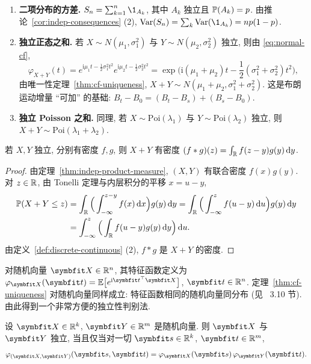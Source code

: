 \begin{example}\label{ex:indep-sums}
\begin{enumerate}
\item \textbf{二项分布的方差.} $S_n=\sum_{k=1}^n\1_{A_k}$, 其中 $A_k$ 独立且 $\P(A_k)=p$. 由推论~\ref{cor:indep-consequences} (2), $\Var(S_n)=\sum_k\Var(\1_{A_k})=np(1-p)$.
\item \textbf{独立正态之和.} 若 $X\sim N(\mu_1,\sigma_1^2)$ 与 $Y\sim N(\mu_2,\sigma_2^2)$ 独立, 则由 \eqref{eq:normal-cf},
\[
\varphi_{X+Y}(t)=e^{\mathrm{i}\mu_1t-\frac{1}{2}\sigma_1^2t^2}e^{\mathrm{i}\mu_2t-\frac{1}{2}\sigma_2^2t^2}=\exp\Big(\mathrm{i}(\mu_1+\mu_2)t-\frac{1}{2}(\sigma_1^2+\sigma_2^2)t^2\Big),
\]
由唯一性定理~\ref{thm:cf-uniqueness}, $X+Y\sim N(\mu_1+\mu_2,\sigma_1^2+\sigma_2^2)$. 这是布朗运动增量 ``可加'' 的基础: $B_t-B_0=(B_t-B_s)+(B_s-B_0)$.
\item \textbf{独立 Poisson 之和.} 同理, 若 $X\sim\mathrm{Poi}(\lambda_1)$ 与 $Y\sim\mathrm{Poi}(\lambda_2)$ 独立, 则 $X+Y\sim\mathrm{Poi}(\lambda_1+\lambda_2)$.
\end{enumerate}
\end{example}

\begin{proposition}[卷积公式]\label{prop:convolution}
若 $X,Y$ 独立, 分别有密度 $f,g$, 则 $X+Y$ 有密度 $(f*g)(z)=\int_{\R}f(z-y)g(y)\dd y$.
\end{proposition}

\begin{proof}
由定理~\ref{thm:indep-product-measure}, $(X,Y)$ 有联合密度 $f(x)g(y)$. 对 $z\in\R$, 由 Tonelli 定理与内层积分的平移 $x=u-y$,
\begin{align*}
\P(X+Y\le z)&=\int_{\R}\Big(\int_{-\infty}^{z-y}f(x)\dd x\Big)g(y)\dd y=\int_{\R}\Big(\int_{-\infty}^{z}f(u-y)\dd u\Big)g(y)\dd y\\
&=\int_{-\infty}^z\Big(\int_{\R}f(u-y)g(y)\dd y\Big)\dd u.
\end{align*}
由定义~\ref{def:discrete-continuous} (2), $f*g$ 是 $X+Y$ 的密度.
\end{proof}

对随机向量 $\rvec{X}\in\R^n$, 其特征函数定义为 $\varphi_{\rvec{X}}(\rvec{t})=\E\big[e^{\mathrm{i}\rvec{t}^\T\rvec{X}}\big]$, $\rvec{t}\in\R^n$. 定理~\ref{thm:cf-uniqueness} 对随机向量同样成立: 特征函数相同的随机向量同分布 (见~\cite{durrett} 3.10 节). 由此得到一个非常方便的独立性判别法.

\begin{theorem}[独立性的特征函数判别法]\label{thm:indep-cf}
设 $\rvec{X}\in\R^k$, $\rvec{Y}\in\R^m$ 是随机向量. 则 $\rvec{X}$ 与 $\rvec{Y}$ 独立, 当且仅当对一切 $\rvec{s}\in\R^k$, $\rvec{t}\in\R^m$,
\[
\varphi_{(\rvec{X},\rvec{Y})}(\rvec{s},\rvec{t})=\varphi_{\rvec{X}}(\rvec{s})\,\varphi_{\rvec{Y}}(\rvec{t}).
\]
\end{theorem}

